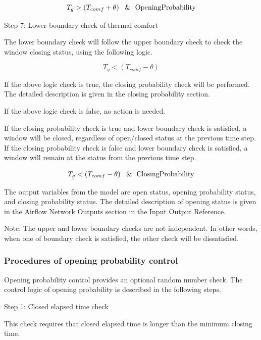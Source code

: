 \begin{equation}
T_g > \left(T_{comf} + \theta\right)~~\&~~\rm{OpeningProbability}
\end{equation}

Step 7: Lower boundary check of thermal comfort

The lower boundary check will follow the upper boundary check to check the window closing status, using the following logic.

\begin{equation}
T_g < \left(T_{comf} - \theta\right)
\end{equation}

If the above logic check is true, the closing probability check will be performed. The detailed description is given in the closing probability section.

If the above logic check is false, no action is needed.

If the closing probability check is true and lower boundary check is satisfied, a window will be closed, regardless of open/closed status at the previous time step. If the closing probability check is false and lower boundary check is satisfied, a window will remain at the status from the previous time step.

\begin{equation}
T_g < \left(T_{comf} - \theta\right)~~\&~~\rm{ClosingProbability}
\end{equation}

The output variables from the model are open status, opening probability status, and closing probability status. The detailed description of opening status is given in the Airflow Network Outputs section in the Input Output Reference.

Note: The upper and lower boundary checks are not independent. In other words, when one of boundary check is satisfied, the other check will be dissatisfied.

\subsubsection{Procedures of opening probability control}\label{procedures-of-opening-probability-control}

Opening probability control provides an optional random number check. The control logic of opening probability is described in the following steps.

Step 1: Closed elapsed time check

This check requires that closed elapsed time is longer than the minimum closing time.

